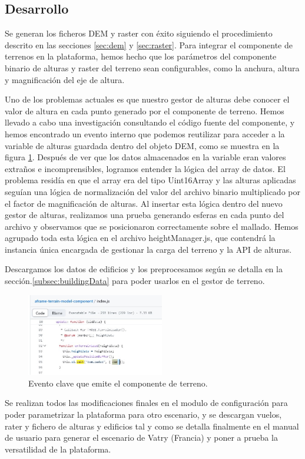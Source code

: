 \documentclass[a4paper, 11pt]{book}
\begin{document}
\subsection{Desarrollo}
Se generan los ficheros DEM y raster con éxito siguiendo el procedimiento descrito en las secciones \ref{sec:dem} y \ref{sec:raster}. Para integrar el componente de terrenos en la plataforma, hemos hecho que los parámetros del componente binario de alturas y raster del terreno sean configurables, como la anchura, altura y magnificación del eje de altura.

Uno de los problemas actuales es que nuestro gestor de alturas debe conocer el valor de altura en cada punto generado por el componente de terreno. Hemos llevado a cabo una investigación consultando el código fuente del componente, y hemos encontrado un evento interno que podemos reutilizar para acceder a la variable de alturas guardada dentro del objeto DEM, como se muestra en la figura \ref{fig:terrain_evento}. Después de ver que los datos almacenados en la variable eran valores extraños e incomprensibles, logramos entender la lógica del array de datos. El problema residía en que el array era del tipo Uint16Array y las alturas aplicadas seguían una lógica de normalización del valor del archivo binario multiplicado por el factor de magnificación de alturas. Al insertar esta lógica dentro del nuevo gestor de alturas, realizamos una prueba generando esferas en cada punto del archivo y observamos que se posicionaron correctamente sobre el mallado.
Hemos agrupado toda esta lógica en el archivo heightManager.js, que contendrá la instancia única encargada de gestionar la carga del terreno y la API de alturas.

Descargamos los datos de edificios y los preprocesamos según se detalla en la sección.\ref{subsec:buildingData} para poder usarlos en el gestor de terreno.

\begin{figure}[H]
  \centering
  \includegraphics[width=6cm, keepaspectratio]{img/terrain_evento.jpg}
  \caption{Evento clave que emite el componente de terreno.}
  \label{fig:terrain_evento}
\end{figure}
Se realizan todos las modificaciones finales en el modulo de configuración para poder parametrizar la plataforma para otro escenario, y se descargan vuelos, rater y fichero de alturas y edificios tal y como se detalla finalmente en el manual de usuario para generar el escenario de Vatry (Francia) y poner a prueba la versatilidad de la plataforma.
\end{document}
